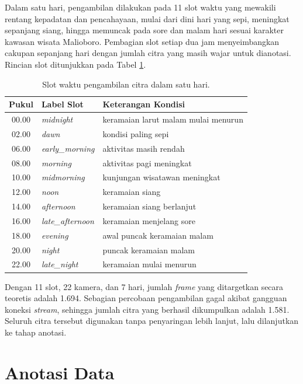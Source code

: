 Dalam satu hari, pengambilan dilakukan pada 11 slot waktu yang mewakili rentang kepadatan 
dan pencahayaan, mulai dari dini hari yang sepi, meningkat sepanjang siang, hingga memuncak 
pada sore dan malam hari sesuai karakter kawasan wisata Malioboro. Pembagian slot setiap dua 
jam menyeimbangkan cakupan sepanjang hari dengan jumlah citra yang masih wajar untuk 
dianotasi. Rincian slot ditunjukkan pada Tabel \ref{tab:slot_pengumpulan}.

\begin{table}[h]
    \centering
    \caption{Slot waktu pengambilan citra dalam satu hari.}
    \label{tab:slot_pengumpulan}
    \begin{tabular}{|c|l|l|}
        \hline
        \textbf{Pukul} & \textbf{Label Slot} & \textbf{Keterangan Kondisi} \\
        \hline \hline
        00.00 & \textit{midnight} & keramaian larut malam mulai menurun \\
        02.00 & \textit{dawn} & kondisi paling sepi \\
        06.00 & \textit{early\_morning} & aktivitas masih rendah \\
        08.00 & \textit{morning} & aktivitas pagi meningkat \\
        10.00 & \textit{midmorning} & kunjungan wisatawan meningkat \\
        12.00 & \textit{noon} & keramaian siang \\
        14.00 & \textit{afternoon} & keramaian siang berlanjut \\
        16.00 & \textit{late\_afternoon} & keramaian menjelang sore \\
        18.00 & \textit{evening} & awal puncak keramaian malam \\
        20.00 & \textit{night} & puncak keramaian malam \\
        22.00 & \textit{late\_night} & keramaian mulai menurun \\
        \hline
    \end{tabular}
\end{table}

Dengan 11 slot, 22 kamera, dan 7 hari, jumlah \textit{frame} yang ditargetkan secara 
teoretis adalah 1.694. Sebagian percobaan pengambilan gagal akibat gangguan koneksi 
\textit{stream}, sehingga jumlah citra yang berhasil dikumpulkan adalah 1.581. Seluruh citra 
tersebut digunakan tanpa penyaringan lebih lanjut, lalu dilanjutkan ke tahap anotasi.

\section{Anotasi Data}
\label{sec:anotasi_data}

